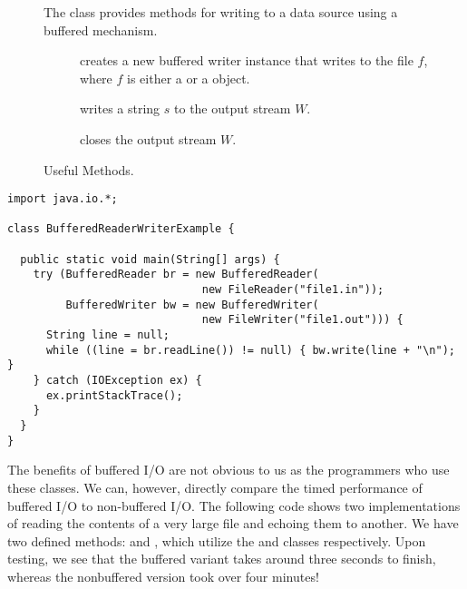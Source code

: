 \begin{figure}[tp]
  \small
  \begin{tcolorbox}[title=BufferedWriter Methods]
    The  class provides methods for writing to a data source using a buffered mechanism.
    \vspace{2ex}
  \begin{description}
    \item [] creates a new buffered writer instance that writes to the file $f$, where $f$ is either a  or a  object.
    \item [] writes a string $s$ to the output stream $W$.
    \item [] closes the output stream $W$.
  \end{description}
\end{tcolorbox}
  \caption{Useful  Methods.}
  \label{fig:bw}
\end{figure}


\begin{lstlisting}[language=MyJava]
import java.io.*;

class BufferedReaderWriterExample {

  public static void main(String[] args) {
    try (BufferedReader br = new BufferedReader(
                              new FileReader("file1.in"));
         BufferedWriter bw = new BufferedWriter(
                              new FileWriter("file1.out"))) {
      String line = null;
      while ((line = br.readLine()) != null) { bw.write(line + "\n"); }
    } catch (IOException ex) {
      ex.printStackTrace();
    }
  }
}
\end{lstlisting}

The benefits of buffered I/O are not obvious to us as the programmers who use these classes. We can, however, directly compare the timed performance of buffered I/O to non-buffered I/O. The following code shows two implementations of reading the contents of a very large file and echoing them to another. We have two defined methods:  and , which utilize the  and  classes respectively. Upon testing, we see that the buffered variant takes around three seconds to finish, whereas the nonbuffered version took over four minutes!

